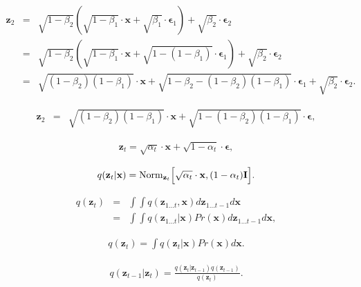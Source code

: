 \documentclass[letterpaper,twoside,openany, titlepage,oldfontcommands,titles,dvipsnames]{memoir}
\begin{document}
\begin{eqnarray}\label{eq:diffusion_sample_step2}
  \mathbf{z}_{2} &=& \sqrt{1-\beta_{2}}\left( \sqrt{1-\beta_{1}}\cdot\mathbf{x} + \sqrt{\beta_{1}}\cdot\boldsymbol\epsilon_{1}\right) + \sqrt{\beta_{2}}\cdot\boldsymbol\epsilon_{2}\\
  &=& \sqrt{1-\beta_{2}}\left( \sqrt{1-\beta_{1}}\cdot\mathbf{x} + \sqrt{1-(1-\beta_{1})}\cdot\boldsymbol\epsilon_{1}\right) + \sqrt{\beta_{2}}\cdot\boldsymbol\epsilon_{2}\nonumber \\
  &=& \sqrt{(1-\beta_{2})(1-\beta_{1})}\cdot \mathbf{x} + \sqrt{1-\beta_{2}-(1-\beta_{2})(1-\beta_{1})}\cdot\boldsymbol\epsilon_{1}+\sqrt{\beta_{2}}\cdot\boldsymbol\epsilon_{2}.\nonumber
 \end{eqnarray}

\begin{eqnarray}
 \mathbf{z}_{2} &=& \sqrt{(1-\beta_{2})(1-\beta_{1})} \cdot \mathbf{x} + \sqrt{1-(1-\beta_{2})(1-\beta_{1})}\cdot\boldsymbol\epsilon,
 \end{eqnarray}

\begin{eqnarray}
 \mathbf{z}_{t} = \sqrt{\alpha_t}\cdot \mathbf{x} + \sqrt{1-\alpha_t}\cdot\boldsymbol\epsilon,
 \end{eqnarray}

\begin{eqnarray}
 q(\mathbf{z}_{t}|\mathbf{x}) =\mbox{Norm}_{\mathbf{z}_{t}}\Bigl[\sqrt{\alpha_t}\cdot\mathbf{x},(1-\alpha_{t})\mathbf{I}\Bigr].
 \end{eqnarray}

\begin{eqnarray}
 q(\mathbf{z}_{t}) &=& \int \!\!\int q(\mathbf{z}_{1\ldots t},\mathbf{x})d\mathbf{z}_{1\ldots t-1}d\mathbf{x}\nonumber \\
 &=&\int \!\!\int q(\mathbf{z}_{1\ldots t}|\mathbf{x})Pr(\mathbf{x})d\mathbf{z}_{1\ldots t-1}d\mathbf{x},
 \end{eqnarray}

\begin{eqnarray}
 q(\mathbf{z}_{t}) =\int q(\mathbf{z}_{t}|\mathbf{x})Pr(\mathbf{x})d\mathbf{x}.
 \end{eqnarray}



\begin{eqnarray}
 q(\mathbf{z}_{t-1}|\mathbf{z}_{t}) = \frac{q(\mathbf{z}_{t}|\mathbf{z}_{t-1})q(\mathbf{z}_{t-1}) }{q(\mathbf{z}_{t})}.
 \end{eqnarray}
\end{document}
